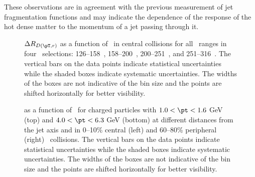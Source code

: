 These observations are in agreement with the previous measurement of jet fragmentation functions \cite{Chatrchyan:2014ava, Sirunyan:2018jqr, Aaboud:2017bzv, PhysRevC.98.024908} and may indicate the dependence of the response of the hot dense matter to the momentum of a jet passing through it. 

\begin{figure}
   \caption{$\Delta \RDptr$ as a function of \rvar\ in central collisions for all \pt\ ranges in four \ptjet\ selections: 126--158~\GeV, 158--200~\GeV, 200--251~\GeV, and 251--316~\GeV. The vertical bars on the data points indicate statistical uncertainties while the shaded boxes indicate systematic uncertainties. The widths of the boxes are not indicative of the bin size and the points are shifted horizontally for better visibility. }
      \label{fig:deltadptr}
\end{figure}


\begin{figure}
   \caption{\RDptr as a function of \ptjet\ for charged particles with $1.0 < \pt < 1.6$ GeV (top) and $4.0 < \pt < 6.3$ GeV (bottom) at different distances from the jet axis and in 0--10\% central (left) and 60--80\% peripheral (right) \pbpb\ collisions. The vertical bars on the data points indicate statistical uncertainties while the shaded boxes indicate systematic uncertainties. The widths of the boxes are not indicative of the bin size and the points are shifted horizontally for better visibility.}
      \label{fig:rdptr_jetpt}
\end{figure}



